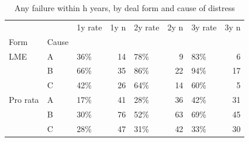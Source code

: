 \begin{table}[htbp]
\centering
\caption{Any failure within h years, by deal form and cause of distress}
\label{tab:rates}
\begin{tabular}{lllrlrlr}
\toprule
 &  & 1y rate & 1y n & 2y rate & 2y n & 3y rate & 3y n \\
Form & Cause &  &  &  &  &  &  \\
\midrule
LME & A & 36\% & 14 & 78\% & 9 & 83\% & 6 \\
 & B & 66\% & 35 & 86\% & 22 & 94\% & 17 \\
 & C & 42\% & 26 & 64\% & 14 & 60\% & 5 \\
Pro rata & A & 17\% & 41 & 28\% & 36 & 42\% & 31 \\
 & B & 30\% & 76 & 52\% & 63 & 69\% & 45 \\
 & C & 28\% & 47 & 31\% & 42 & 33\% & 30 \\
\bottomrule
\end{tabular}
\end{table}

